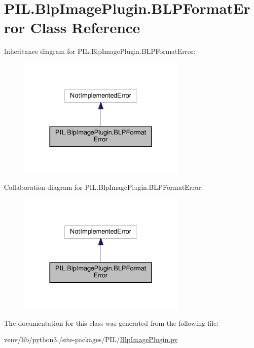 \hypertarget{classPIL_1_1BlpImagePlugin_1_1BLPFormatError}{}\section{P\+I\+L.\+Blp\+Image\+Plugin.\+B\+L\+P\+Format\+Error Class Reference}
\label{classPIL_1_1BlpImagePlugin_1_1BLPFormatError}


Inheritance diagram for P\+I\+L.\+Blp\+Image\+Plugin.\+B\+L\+P\+Format\+Error\+:
\nopagebreak
\begin{figure}[H]
\begin{center}
\leavevmode
\includegraphics[width=235pt]{classPIL_1_1BlpImagePlugin_1_1BLPFormatError__inherit__graph}
\end{center}
\end{figure}


Collaboration diagram for P\+I\+L.\+Blp\+Image\+Plugin.\+B\+L\+P\+Format\+Error\+:
\nopagebreak
\begin{figure}[H]
\begin{center}
\leavevmode
\includegraphics[width=235pt]{classPIL_1_1BlpImagePlugin_1_1BLPFormatError__coll__graph}
\end{center}
\end{figure}


The documentation for this class was generated from the following file\+:\begin{DoxyCompactItemize}
\item 
venv/lib/python3./site-\/packages/\+P\+I\+L/\hyperlink{BlpImagePlugin_8py}{Blp\+Image\+Plugin.\+py}\end{DoxyCompactItemize}
